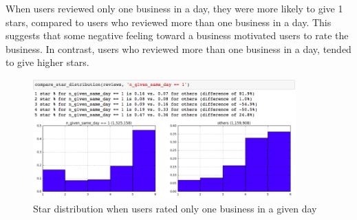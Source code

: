 \documentclass[11pt]{article}
\begin{document}
\par When users reviewed only one business in a day, they were more likely to give 1 stars, compared to users who reviewed more than one business in a day. This suggests that some negative feeling toward a business motivated users to rate the business. In contrast, users who reviewed more than one business in a day, tended to give higher stars.
\begin{figure}[H]
\centering
\includegraphics[width=0.9\textwidth]{./ac209/numstarsreviewsperday.png}
\caption{Star distribution when users rated only one business in a given day}
\end{figure}
\end{document}
